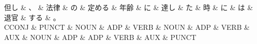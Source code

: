 \documentclass[tikz,border=5pt]{standalone}
\begin{document}
\normalsize
\begin{dependency}[edge unit distance=12.0pt]
    \begin{deptext}[column sep=1em]
        但し \& 、 \& 法律 \& の \& 定める \& 年齢 \& に \& 達し \& た \& 時 \& に \& は \& 退官 \& する \& 。\\
        CCONJ \& PUNCT \& NOUN \& ADP \& VERB \& NOUN \& ADP \& VERB \& AUX \& NOUN \& ADP \& ADP \& VERB \& AUX \& PUNCT\\
    \end{deptext}
\end{dependency}
\end{document}
